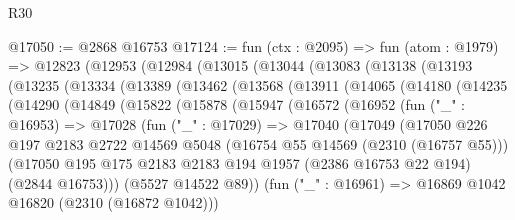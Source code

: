 \begin{lexlean}{R30}
\begin{coremodule}
@17050 := @2868 @16753
@17124 := fun (ctx : @2095) =>
  fun (atom : @1979) =>
  @12823
    (@12953
      (@12984
        (@13015
          (@13044
            (@13083
              (@13138
                (@13193
                  (@13235
                    (@13334
                      (@13389
                        (@13462
                          (@13568
                            (@13911
                              (@14065
                                (@14180
                                  (@14235
                                    (@14290
                                      (@14849
                                        (@15822
                                          (@15878
                                            (@15947
                                              (@16572
                                                (@16952
                                                  (fun ("_" : @16953) =>
                                                  @17028
                                                    (fun ("_" : @17029) =>
                                                    @17040
                                                      (@17049
                                                        (@17050
                                                          @226
                                                          @197
                                                          @2183
                                                          @2722
                                                          @14569
                                                          @5048
                                                          (@16754 @55 @14569 (@2310 (@16757 @55)))
                                                          (@17050
                                                            @195
                                                            @175
                                                            @2183
                                                            @2183
                                                            @194
                                                            @1957
                                                            (@2386 @16753 @22 @194)
                                                            (@2844 @16753)))
                                                        (@5527 @14522 @89))
                                                      (fun ("_" : @16961) =>
                                                      @16869 @1042 @16820 (@2310 (@16872 @1042)))

\end{coremodule}
\end{lexlean}
